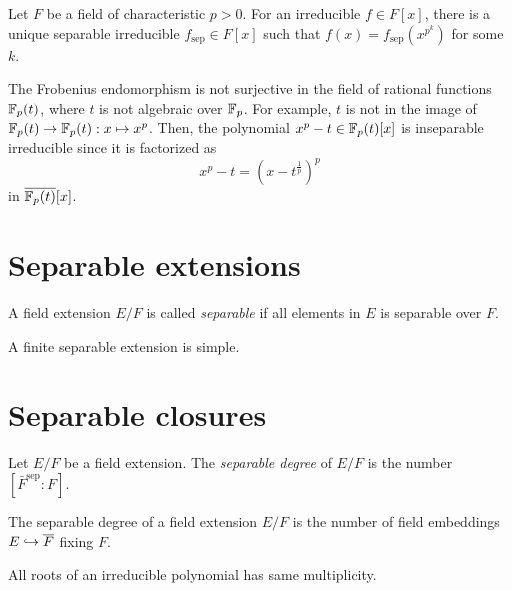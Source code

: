 \documentclass{../note}
\newcommand{\sep}{\mathrm{sep}}
\begin{document}
\begin{prop}
Let $F$ be a field of characteristic $p>0$.
For an irreducible $f\in F[x]$, there is a unique separable irreducible $f_\sep\in F[x]$ such that $f(x)=f_\sep(x^{p^k})$ for some $k$.
\end{prop}

\begin{ex}
The Frobenius endomorphism is not surjective in the field of rational functions $\mathbb{F}_p(t)$, where $t$ is not algebraic over $\mathbb{F}_p$.
For example, $t$ is not in the image of $\mathbb{F}_p(t)\to\mathbb{F}_p(t):x\mapsto x^p$.
Then, the polynomial $x^p-t\in\mathbb{F}_p(t)[x]$ is inseparable irreducible since it is factorized as
\[x^p-t=(x-t^{\frac1p})^p\]
in $\overline{\mathbb{F}_p(t)}[x]$.
\end{ex}

\section{Separable extensions}
\begin{defn}
A field extension $E/F$ is called \emph{separable} if all elements in $E$ is separable over $F$.
\end{defn}

\begin{thm}
A finite separable extension is simple.
\end{thm}





\section{Separable closures}



\begin{defn}
Let $E/F$ be a field extension.
The \emph{separable degree} of $E/F$ is the number $[\bar F^{\sep}:F]$.
\end{defn}



\begin{thm}
The separable degree of a field extension $E/F$ is the number of field embeddings $E\hookrightarrow\overline F$ fixing $F$.
\end{thm}

\begin{lem}
All roots of an irreducible polynomial has same multiplicity.
\end{lem}
\begin{pf}
\end{pf}
\end{document}
